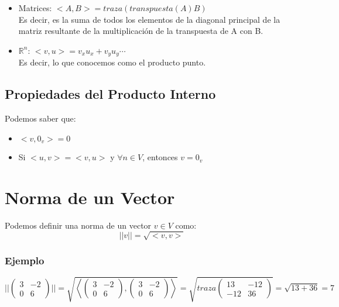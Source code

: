 \documentclass[12pt]{report}							    %
\begin{document}
        \begin{itemize}
            \item Matrices: $<A, B> = traza( transpuesta(A)B)$ \\ Es decir, es la suma de
            todos los elementos de la diagonal
            principal de la matriz resultante de la multiplicación de la transpuesta de A con B.

            \item $\mathbb{R}^n$: $<v, u> = v_x u_x + v_y u_y \cdots$ \\ Es decir, lo que
            conocemos como el producto punto. 
        \end{itemize}


        \subsection{Propiedades del Producto Interno}
        Podemos saber que:
        \begin{itemize}
            \item $<v, 0_v> = 0$
            \item Si $<u, v> = <v, u>$ y $\forall n \in V$, entonces $v = 0_v$
        \end{itemize}


    \clearpage
    \section{Norma de un Vector}
        Podemos definir una norma de un vector $v \in V$ como:
        \begin{equation}
            ||v|| = \sqrt{<v,v>}
        \end{equation}

        \subsubsection{Ejemplo}

        \begin{equation*}
            ||\begin{pmatrix} 3 & -2 \\ 0 & 6 \end{pmatrix}|| = \sqrt{ \left<  \begin{pmatrix} 3 & -2 \\ 0 & 6 \end{pmatrix}, \begin{pmatrix} 3 & -2 \\ 0 & 6 \end{pmatrix} \right>} =  \sqrt{ traza  \begin{pmatrix} 13 & -12 \\ -12 & 36 \end{pmatrix} } = \sqrt{13+36} = 7  
        \end{equation*}
\end{document}
